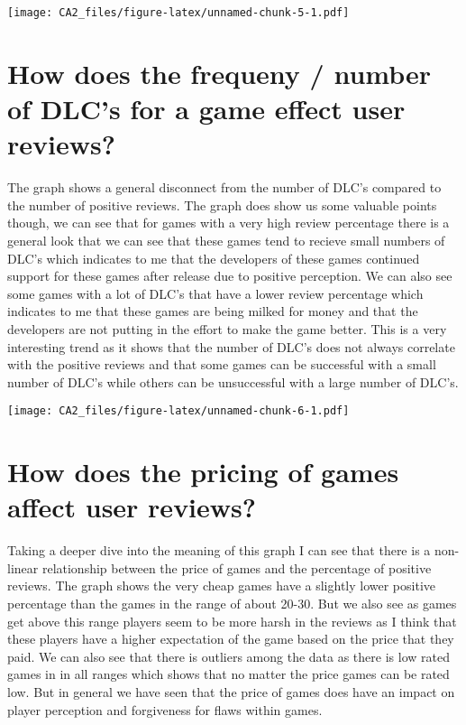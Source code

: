 \documentclass[
]{article}
\begin{document}
\texttt{[image: CA2\_files/figure-latex/unnamed-chunk-5-1.pdf]}

\section{How does the frequeny / number of DLC's for a game effect user
reviews?}\label{how-does-the-frequeny-number-of-dlcs-for-a-game-effect-user-reviews-1}

The graph shows a general disconnect from the number of DLC's compared
to the number of positive reviews. The graph does show us some valuable
points though, we can see that for games with a very high review
percentage there is a general look that we can see that these games tend
to recieve small numbers of DLC's which indicates to me that the
developers of these games continued support for these games after
release due to positive perception. We can also see some games with a
lot of DLC's that have a lower review percentage which indicates to me
that these games are being milked for money and that the developers are
not putting in the effort to make the game better. This is a very
interesting trend as it shows that the number of DLC's does not always
correlate with the positive reviews and that some games can be
successful with a small number of DLC's while others can be unsuccessful
with a large number of DLC's.

\texttt{[image: CA2\_files/figure-latex/unnamed-chunk-6-1.pdf]}

\section{How does the pricing of games affect user
reviews?}\label{how-does-the-pricing-of-games-affect-user-reviews-1}

Taking a deeper dive into the meaning of this graph I can see that there
is a non-linear relationship between the price of games and the
percentage of positive reviews. The graph shows the very cheap games
have a slightly lower positive percentage than the games in the range of
about 20-30. But we also see as games get above this range players seem
to be more harsh in the reviews as I think that these players have a
higher expectation of the game based on the price that they paid. We can
also see that there is outliers among the data as there is low rated
games in in all ranges which shows that no matter the price games can be
rated low. But in general we have seen that the price of games does have
an impact on player perception and forgiveness for flaws within games.
\end{document}
